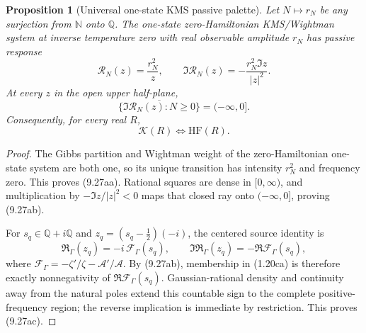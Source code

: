 \documentclass[11pt]{article}
\newtheorem{proposition}[theorem]{Proposition}
\begin{document}
\begin{proposition}[Universal one-state KMS passive palette]
\label{prop:universal-kms-palette}
Let $N\mapsto r_N$ be any surjection from $\mathbb N$ onto $\mathbb Q$.  The one-state
zero-Hamiltonian KMS/Wightman system at inverse temperature zero with real observable amplitude
$r_N$ has passive response
\[
 \mathcal R_N(z)=\frac{r_N^2}{z},\qquad
 \Im\mathcal R_N(z)=-\frac{r_N^2\Im z}{|z|^2}.
 \tag{9.27aa}
\]
At every $z$ in the open upper half-plane,
\[
 \overline{\{\Im\mathcal R_N(z):N\ge0\}}=(-\infty,0].
 \tag{9.27ab}
\]
Consequently, for every real $R$,
\[
 \mathcal K(R)\Longleftrightarrow\mathrm{HF}(R).
 \tag{9.27ac}
\]
\end{proposition}

\begin{proof}
The Gibbs partition and Wightman weight of the zero-Hamiltonian one-state system are both one,
so its unique transition has intensity $r_N^2$ and frequency zero.  This proves
\textup{(9.27aa)}.  Rational squares are dense in $[0,\infty)$, and multiplication by
$-\Im z/|z|^2<0$ maps that closed ray onto $(-\infty,0]$, proving \textup{(9.27ab)}.

For $s_q\in\mathbb Q+i\mathbb Q$ and $z_q=(s_q-\frac12)(-i)$, the centered source identity is
\[
 \mathfrak R_\Gamma(z_q)=-i\,\mathcal F_\Gamma(s_q),
 \qquad
 \Im\mathfrak R_\Gamma(z_q)=-\Re\mathcal F_\Gamma(s_q),
 \tag{9.27ae}
\]
where $\mathcal F_\Gamma=-\zeta'/\zeta-\mathcal A'/\mathcal A$.
By \textup{(9.27ab)}, membership in \textup{(1.20ca)} is therefore exactly nonnegativity of
$\Re\mathcal F_\Gamma(s_q)$.  Gaussian-rational density and continuity away from the natural
poles extend this countable sign to the complete positive-frequency region; the reverse
implication is immediate by restriction.  This proves \textup{(9.27ac)}.
\end{proof}
\end{document}
